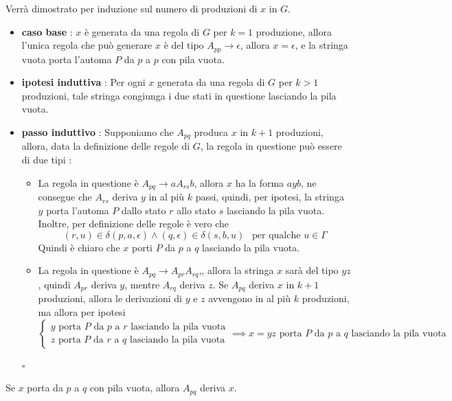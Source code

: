 \documentclass[10pt, letterpaper]{report}
\begin{document}
 Verrà dimostrato per induzione sul numero di produzioni di $x$ in $G$.\begin{itemize}
    \item \textbf{caso base} : $x$ è generata da una regola di $G$ per $k=1$ produzione, allora l'unica regola 
    che può generare $x$ è del tipo $A_{pp}\longrightarrow \epsilon$, allora $x=\epsilon$, e la stringa vuota porta 
    l'automa $P$ da $p$ a $p$ con pila vuota. 
    \item \textbf{ipotesi induttiva} : Per ogni $x$ generata da una regola di $G$ per $k>1$ produzioni, tale stringa 
    congiunga i due stati in questione lasciando la pila vuota. 
    \item \textbf{passo induttivo} : Supponiamo che $A_{pq}$ produca $x$ in $k+1$ produzioni, allora, data la definizione 
    delle regole di $G$, la regola in questione può essere di due tipi : \begin{itemize}
        \item La regola in questione è $A_{pq}\longrightarrow aA_{rs}b$, allora $x$ ha la forma $ayb$, ne consegue che 
        $A_{rs}$ deriva $y$ in al più $k$ passi, quindi, per ipotesi, la stringa $y$ porta l'automa $P$ dallo stato
        $r$ allo stato $s$ lasciando la pila vuota. Inoltre, per definizione delle regole è vero che 
        $$ (r,u)\in\delta(p,a,\epsilon)\land (q,\epsilon)\in\delta(s,b,u) \ \ \text{ per qualche }u\in\Gamma$$
        Quindi è chiaro che $x$ porti $P$ da $p$ a $q$ lasciando la pila vuota. 
        \item La regola in questione è $A_{pq}\longrightarrow A_{pr}A_{rq}$,, allora la stringa $x$ sarà del tipo 
        $yz$, quindi $A_{pr}$ deriva $y$, mentre $A_{rq}$ deriva $z$. Se $A_{pq}$ deriva $x$ in $k+1$ produzioni, allora 
        le derivazioni di $y$ e $z$ avvengono in al più $k$ produzioni, ma allora per ipotesi$$\begin{cases}
            y\text{ porta $P$ da $p$ a $r$ lasciando la pila vuota}\\ 
            z\text{ porta $P$ da $r$ a $q$ lasciando la pila vuota}
        \end{cases}\implies x=yz\text{ porta $P$ da $p$ a $q$ lasciando la pila vuota} $$
    \end{itemize}
    \hfill $\square$
\end{itemize}
 Se $x$ porta da $p$ a $q$ con pila vuota, allora $A_{pq}$ deriva $x$.\acc
\end{document}

